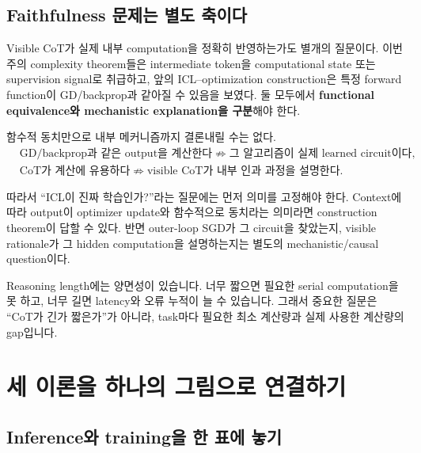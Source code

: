 \documentclass[11pt,a4paper,oneside,openany]{memoir}
\theoremstyle{definition}
\begin{document}
\section{Faithfulness 문제는 별도 축이다}

Visible CoT가 실제 내부 computation을 정확히 반영하는가도 별개의 질문이다. 이번 주의 complexity theorem들은 intermediate token을 computational state 또는 supervision signal로 취급하고, 앞의 ICL--optimization construction은 특정 forward function이 GD/backprop과 같아질 수 있음을 보였다. 둘 모두에서 \textbf{functional equivalence와 mechanistic explanation을 구분}해야 한다.

함수적 동치만으로 내부 메커니즘까지 결론내릴 수는 없다.
\[
\begin{aligned}
&\text{GD/backprop과 같은 output을 계산한다}\not\Rightarrow
\text{그 알고리즘이 실제 learned circuit이다},\\
&\text{CoT가 계산에 유용하다}\not\Rightarrow
\text{visible CoT가 내부 인과 과정을 설명한다}.
\end{aligned}
\]

따라서 ``ICL이 진짜 학습인가?''라는 질문에는 먼저 의미를 고정해야 한다. Context에 따라 output이 optimizer update와 함수적으로 동치라는 의미라면 construction theorem이 답할 수 있다. 반면 outer-loop SGD가 그 circuit을 찾았는지, visible rationale가 그 hidden computation을 설명하는지는 별도의 mechanistic/causal question이다.

\begin{presentbox}
Reasoning length에는 양면성이 있습니다. 너무 짧으면 필요한 serial computation을 못 하고, 너무 길면 latency와 오류 누적이 늘 수 있습니다. 그래서 중요한 질문은 ``CoT가 긴가 짧은가''가 아니라, task마다 필요한 최소 계산량과 실제 사용한 계산량의 gap입니다.
\end{presentbox}

\chapter{세 이론을 하나의 그림으로 연결하기}

\section{Inference와 training을 한 표에 놓기}
\end{document}
